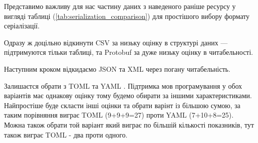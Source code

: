 \documentclass[14pt]{extarticle}
\begin{document}
  Представимо важливу для нас частину даних з наведеного раніше ресурсу
  у вигляді таблиці (\ref{tab:serialization_comparison})
  для простішого вибору формату серіалізації.

  \begin{table}
    \centering
  \end{table}

  Одразу ж доцільно відкинути CSV \cite{wiki_csv}
  за низьку оцінку в структурі даних --- підтримуются тільки таблиці,
  та Protobuf \cite{wiki_protobuf} за дуже низьку оцінку в читабельності.

  Наступним кроком відкидаємо JSON \cite{wiki_json}
  та XML \cite{wiki_xml} через погану читабельність.

  Залишаєтся обрати з TOML \cite{wiki_toml} та YAML \cite{wiki_yaml}.
  Підтримка мов програмування у обох
  варіантів має однакову оцінку тому будемо обирати за іншими характеристиками.
  Найпростіше буде скласти інші оцінки та обрати варінт із більшою сумою,
  за таким порівняння виграє TOML (9+9+9=27) проти YAML (7+10+8=25).
  Можна також обрати той варіант який виграє по більшій кількості показників,
  тут також виграє TOML - два проти одного.
\end{document}
